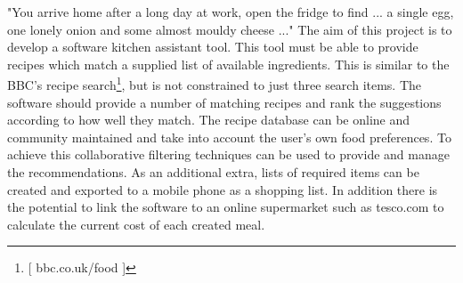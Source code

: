 "You arrive home after a long day at work, open the fridge to find ... a single egg, one lonely onion and some almost mouldy cheese ..." The aim of this project is to develop a software kitchen assistant tool. This tool must be able to provide recipes which match a supplied list of available ingredients. This is similar to the BBC's recipe search\footnote{[ bbc.co.uk/food ]}, but is not constrained to just three search items. The software should provide a number of matching recipes and rank the suggestions according to how well they match. The recipe database can be online and community maintained and take into account the user's own food preferences. To achieve this collaborative filtering techniques can be used to provide and manage the recommendations. As an additional extra, lists of required items can be created and exported to a mobile phone as a shopping list. In addition there is the potential to link the software to an online supermarket such as tesco.com to calculate the current cost of each created meal. 

